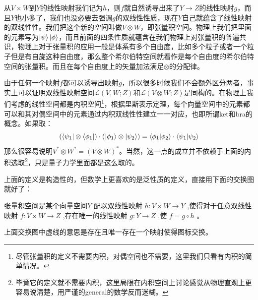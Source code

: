 从$V\times W$到$Y$的线性映射我们记为$h$，则$f$就自然诱导出来了$Y\to Z$的线性映射$g$，而且$Y$也小多了，我们也没必要去强调$g$的双线性性质，现在$Y$自己就蕴含了线性映射的双线性性。我们把这个新的空间叫做$V\otimes W$，即张量积空间。物理上我们把里面的元素写为$\ket{\psi}\ket{\phi}$，而且前面的四条性质就蕴含在我们物理上对张量积的普遍共识，物理上对于张量积的应用一般是体系有多个自由度，比如多个粒子或者一个粒子但是有自旋这种自由度，那么整个希尔伯特空间就看作是每个自由度的希尔伯特空间的张量积。而且在每个自由度上的矢量加法满足$\otimes$的分配律。

由于任何一个映射$f$都可以诱导出映射$g$，所以很多时候我们不会额外区分两者，事实上可以证明双线性映射空间$\mathscr{L}(V,W;Z)$和$\mathscr{L}(V\otimes W;Z)$是同构的。在物理上我们考虑的线性空间都是内积空间\footnote{尽管张量积的定义不需要内积，对偶空间也不需要，这里我们只看有内积的简单情况。}，根据里斯表示定理，每个向量空间中的元素都可以和其对偶空间中的元素通过内积双线性性建立一一对应，也即所谓ket和bra的概念。如果取：
\begin{equation}
	(\bra{\psi_1}\otimes\bra{\phi_1})\cdot (\ket{\phi_1}\otimes\ket{\psi_2})=\braket{\phi_1}{\phi_2}\cdot\braket{\psi_1}{\psi_2}
\end{equation}
那么很容易说明$V^*\otimes W^*=(V\otimes W)^*$。当然，这一点的成立并不依赖于上面的内积选取\footnote{毕竟它的定义就不需要内积，这里局限在内积空间上讨论感觉从物理直观上更容易说清楚，用严谨的general的数学反而迷糊。}，只是量子力学里面都是这么取的。

上面的定义是构造性的，但数学上更喜欢的是泛性质的定义，直接用下面的交换图就好了：
\begin{definition}
	张量积空间是某个向量空间$Y$ 配以双线性映射 $h:V\times W\to Y$ ,使得对于任意双线性映射 $f:V\times W\to Z$ ,存在唯一的线性映射 $g:Y\to Z$ ,使 $f=g\circ h$ 。
	\begin{center}
	\end{center}
	上面交换图中虚线的意思是存在且唯一存在一个映射使得图标交换。
\end{definition}

